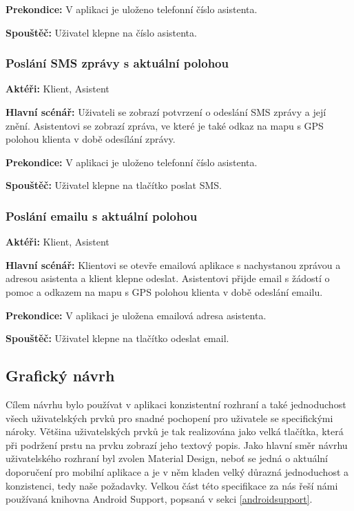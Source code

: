 \documentclass[czech,master,public,dept460,male,java,cpdeclaration]{diploma}
\newcommand{\usecase}[2]{\subsubsection{#1}\label{#2}}
\begin{document}
\vspace{0.1cm}
\noindent
\textbf{Prekondice:} V aplikaci je uloženo telefonní číslo asistenta.

\vspace{0.1cm}
\noindent
\textbf{Spouštěč:} Uživatel klepne na číslo asistenta.

\usecase{Poslání SMS zprávy s aktuální polohou}{pomocsms}
\textbf{Aktéři:} Klient, Asistent

\vspace{0.1cm}
\noindent
\textbf{Hlavní scénář:} Uživateli se zobrazí potvrzení o odeslání SMS zprávy a její znění.
Asistentovi se zobrazí zpráva, ve které je také odkaz na mapu s GPS polohou klienta v době odesílání zprávy.

\vspace{0.1cm}
\noindent
\textbf{Prekondice:} V aplikaci je uloženo telefonní číslo asistenta.

\vspace{0.1cm}
\noindent
\textbf{Spouštěč:} Uživatel klepne na tlačítko poslat SMS.


\usecase{Poslání emailu s aktuální polohou}{pomocemail}
\textbf{Aktéři:} Klient, Asistent

\vspace{0.1cm}
\noindent
\textbf{Hlavní scénář:} Klientovi se otevře emailová aplikace s nachystanou zprávou a adresou asistenta
a klient klepne odeslat. Asistentovi přijde email s žádostí o pomoc a odkazem na mapu s GPS polohou
klienta v době odeslání emailu.

\vspace{0.1cm}
\noindent
\textbf{Prekondice:} V aplikaci je uložena emailová adresa asistenta.

\vspace{0.1cm}
\noindent
\textbf{Spouštěč:} Uživatel klepne na tlačítko odeslat email.

\subsection{Grafický návrh}
Cílem návrhu bylo používat v aplikaci konzistentní rozhraní a také jednoduchost všech uživatelských
prvků pro snadné pochopení pro uživatele se specifickými nároky. Většina uživatelských prvků je tak
realizována jako velká tlačítka, která při podržení prstu na prvku zobrazí jeho textový popis.
Jako hlavní směr návrhu uživatelského rozhraní byl zvolen Material Design, neboť se jedná o aktuální
doporučení pro mobilní aplikace a je v něm kladen velký důrazná jednoduchost a konzistenci,
tedy naše požadavky. Velkou část této specifikace za nás řeší námi používaná knihovna Android Support,
popsaná v sekci \ref{androidsupport}.
\end{document}
